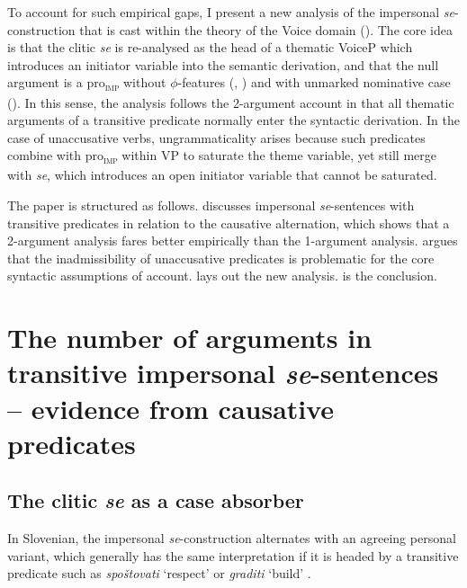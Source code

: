 \documentclass[output=paper,
modfonts,nonflat,
newtxmath
]{langsci/langscibook}
\begin{document}
To account for such empirical gaps, I present a new analysis of the impersonal \textit{se}-construction that is cast within the theory of the Voice domain (\citealt{schaffer2017}). The core idea is that the clitic \textit{se} is re-analysed as the head of a thematic VoiceP which introduces an initiator variable into the semantic derivation, and that the null argument is a pro\textsubscript{\textsc{imp}} without $\phi$-features (\citealt{Fenger2017}, \citealt{ackema2013, ackema2018})  and with unmarked nominative case (\citealt{kornfilt2015}). In this sense, the analysis follows the 2-argument account in that all thematic arguments of a transitive predicate normally enter the syntactic derivation. In the case of unaccusative verbs, ungrammaticality arises because such predicates combine with pro\textsubscript{\textsc{imp}} within VP to saturate the theme variable, yet still merge with \textit{se}, which introduces an open initiator variable that cannot be saturated. \par

The paper is structured as follows.  discusses impersonal \textit{se}-sentences with transitive predicates in relation to the causative alternation, which shows that a 2-argument analysis fares better empirically than the 1-argument analysis.  argues that the inadmissibility of unaccusative predicates is problematic for the core syntactic assumptions of  account.  lays out the new analysis.  is the conclusion.

\section{The number of arguments in transitive impersonal \textit{se}-sentences – evidence from causative predicates} \label{sec2}

\subsection{The clitic \textit{se} as a case absorber}

In Slovenian, the impersonal \textit{se}-construction  alternates with an agreeing personal variant, which generally has the same interpretation if it is headed by a transitive predicate such as \textit{spoštovati} `respect' or \textit{graditi} `build' . 
\end{document}
